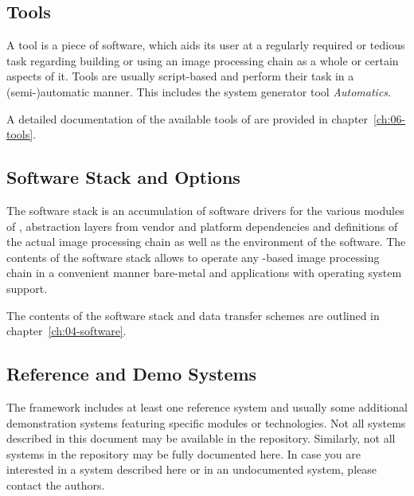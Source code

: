 \subsection{Tools}
A tool is a piece of software, which aids its user at a regularly required or tedious task regarding building or using an image processing chain as a whole or certain aspects of it.
Tools are usually script-based and perform their task in a (semi-)automatic manner.
This includes the \asterics system generator tool \textit{Automatics}.

A detailed documentation of the available tools of \asterics are provided in chapter~\ref{ch:06-tools}.

\subsection{Software Stack and Options}
The software stack is an accumulation of software drivers for the various modules of \asterics, abstraction layers from vendor and platform dependencies and definitions of the actual image processing chain as well as the environment of the software.
The contents of the software stack allows to operate any \asterics-based image processing chain in a convenient manner bare-metal and applications with operating system support.

The contents of the software stack and data transfer schemes are outlined in chapter~\ref{ch:04-software}.

\subsection{Reference and Demo Systems}
The \asterics framework includes at least one reference system and usually some additional demonstration systems featuring specific modules or technologies.
Not all systems described in this document may be available in the repository.
Similarly, not all systems in the repository may be fully documented here.
In case you are interested in a system described here or in an undocumented system, please contact the authors.





%
%






